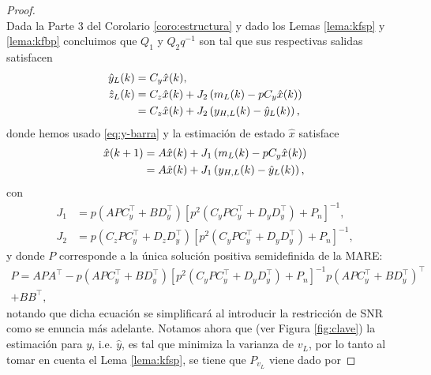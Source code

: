 \begin{proof}{\ \\}
Dada la Parte 3 del Corolario \ref{coro:estructura} y dado los Lemas \ref{lema:kfsp} y \ref{lema:kfbp} concluimos que $Q_1$ y $Q_2q^{-1}$ son tal que sus respectivas salidas satisfacen
\begin{subequations}\label{eq:H-explicito-proof}
\begin{align}
\hat{y}_L(k) & = C_y \hat{x}(k), \\
\hat{z}_L(k) & = C_z \hat{x}(k) + J_2 \left( m_L(k) - pC_y \hat{x}(k) \right) \nonumber \\
             & = C_z \hat{x}(k) + J_2 \left( y_{H,L}(k) - \hat{y}_L(k) \right),
\end{align}
\end{subequations}
donde hemos usado \eqref{eq:y-barra} y la estimaci\'on de estado $\hat{x}$ satisface
\begin{subequations}\label{eq:estado-aux}
\begin{align}
\hat{x}(k+1) & = A\hat{x}(k) + J_1 \left( m_L(k) - pC_y \hat{x}(k) \right) \nonumber \\
             & = A \hat{x}(k) + J_1 \left( y_{H,L}(k) - \hat{y}_L(k) \right),
\end{align}
\end{subequations}
con
\begin{subequations}\label{eq:Js-demo}
\begin{align}
J_1 &= p(APC_y^{\intercal} + BD_y^{\intercal}) \left[ p^2 \left( C_yPC_y^{\intercal} + D_yD_y^{\intercal} \right) + P_n \right]^{-1}, \\
J_2 &= p(C_zPC_y^{\intercal}+D_zD_y^{\intercal})\left[ p^2 \left( C_yPC_y^{\intercal} + D_yD_y^{\intercal} \right) + P_n \right]^{-1},
\end{align}
\end{subequations}
y donde $P$ corresponde a la \'unica soluci\'on positiva semidefinida de la MARE:
\begin{multline}\label{eq:are}
P = APA^{\intercal} - p(APC_y^{\intercal} + BD_y^{\intercal}) \left[ p^2 \left( C_yPC_y^{\intercal} + D_yD_y^{\intercal} \right) + P_n \right]^{-1} p(APC_y^{\intercal} + BD_y^{\intercal})^{\intercal} \\+ BB^{\intercal},
\end{multline}
notando que dicha ecuación se simplificará al introducir la restricción de SNR como se enuncia más adelante. Notamos ahora que (ver Figura \ref{fig:clave}) la estimaci\'on para $y$, i.e. $\hat{y}$, es tal que minimiza la varianza de $v_L$, por lo tanto al tomar en cuenta el Lema \ref{lema:kfsp}, se tiene que $P_{v_L}$ viene dado por

\end{proof}
